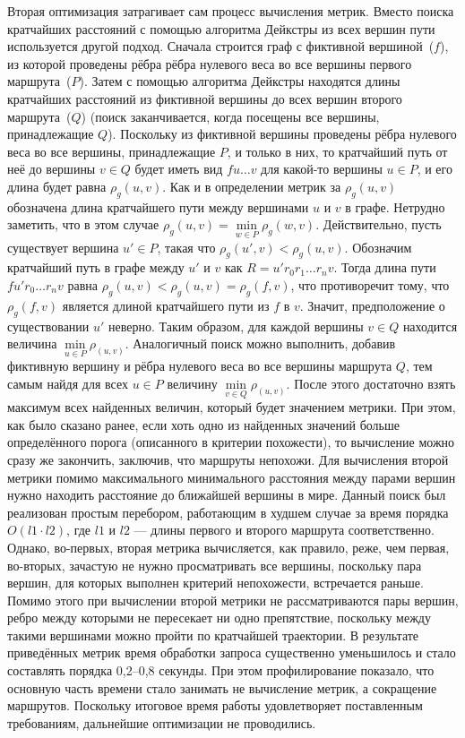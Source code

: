 Вторая оптимизация затрагивает сам процесс вычисления метрик. Вместо
поиска кратчайших расстояний с помощью алгоритма Дейкстры из всех
вершин пути используется другой подход. Сначала строится граф с
фиктивной вершиной~($f$), из которой проведены рёбра рёбра нулевого
веса во все вершины первого маршрута~($P$). Затем с помощью алгоритма
Дейкстры находятся длины кратчайших расстояний из фиктивной вершины до
всех вершин второго маршрута~($Q$) (поиск заканчивается, когда
посещены все вершины, принадлежащие $Q$). Поскольку из фиктивной
вершины проведены рёбра нулевого веса во все вершины, принадлежащие
$P$, и только в них, то кратчайший путь от неё до вершины $v \in Q$
будет иметь вид $fu \dots v$ для какой-то вершины $u \in P$, и его
длина будет равна $\rho_g(u, v)$. Как и в определении метрик за
$\rho_g(u, v)$ обозначена длина кратчайшего пути между вершинами $u$ и
$v$ в графе. Нетрудно заметить, что в этом случае
$\rho_g(u, v) = \min\limits_{w \in P} \rho_g(w, v)$. Действительно,
пусть существует вершина $u' \in P$, такая что
$\rho_g(u', v) < \rho_g(u, v)$. Обозначим кратчайший путь в графе
между $u'$ и $v$ как $R = u'r_0r_1 \dots r_nv$. Тогда длина пути
$fu'r_0 \dots r_nv$ равна
$\rho_g(u, v) < \rho_g(u, v) = \rho_g(f, v)$, что противоречит тому,
что $\rho_g(f, v)$ является длиной кратчайшего пути из $f$ в $v$.
Значит, предположение о существовании $u'$ неверно. Таким образом, для
каждой вершины $v \in Q$ находится величина
$\min\limits_{u \in P} \rho_(u, v)$. Аналогичный поиск можно
выполнить, добавив фиктивную вершину и рёбра нулевого веса во все
вершины маршрута $Q$, тем самым найдя для всех $u \in P$ величину
$\min\limits_{v \in Q} \rho_(u, v)$. После этого достаточно взять
максимум всех найденных величин, который будет значением метрики. При
этом, как было сказано ранее, если хоть одно из найденных значений
больше определённого порога (описанного в критерии похожести), то
вычисление можно сразу же закончить, заключив, что маршруты непохожи.
Для вычисления второй метрики помимо максимального минимального
расстояния между парами вершин нужно находить расстояние до ближайшей
вершины в мире. Данный поиск был реализован простым перебором,
работающим в худшем случае за время порядка $O(l1 \cdot l2)$, где $l1$
и $l2$ --- длины первого и второго маршрута соответственно. Однако,
во-первых, вторая метрика вычисляется, как правило, реже, чем первая,
во-вторых, зачастую не нужно просматривать все вершины, поскольку пара
вершин, для которых выполнен критерий непохожести, встречается раньше.
Помимо этого при вычислении второй метрики не рассматриваются пары
вершин, ребро между которыми не пересекает ни одно препятствие,
поскольку между такими вершинами можно пройти по кратчайшей
траектории. В результате приведённых метрик время обработки запроса
существенно уменьшилось и стало составлять порядка 0,2--0,8 секунды.
При этом профилирование показало, что основную часть времени стало
занимать не вычисление метрик, а сокращение маршрутов. Поскольку
итоговое время работы удовлетворяет поставленным требованиям,
дальнейшие оптимизации не проводились.

